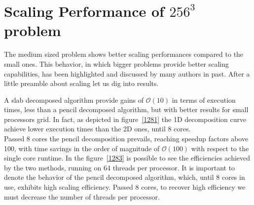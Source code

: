 \section{Scaling Performance of $256^{3}$ problem}
The medium sized problem shows better scaling performances compared to the small ones.
This behavior, in which bigger problems provide better scaling capabilities, has been highlighted and discussed by many authors in past.
After a little preamble about scaling let us dig into results.\\
\par
A slab decomposed algorithm provide gains of $\mathcal{O}(10)$ in terms of execution times, less than a pencil decomposed algorithm, but with better results for small processors grid. In fact, as depicted in figure~\ref{1281} the 1D decomposition curve achieve lower execution times than the 2D ones, until 8 cores.\\
Passed 8 cores the pencil decomposition prevails, reaching speedup factors above 100, with time savings in the order of magnitude of $\mathcal{O}(100)$ with respect to the single core runtime.
In the figure~\ref{1283} is possible to see the efficiencies achieved by the two methods, running on 64 threads per processor. It is important to denote the behavior of the pencil decomposed algorithm, which, until 8 cores in use, exhibits high scaling efficiency.
Passed 8 cores, to recover high efficiency we must decrease the number of threads per processor.